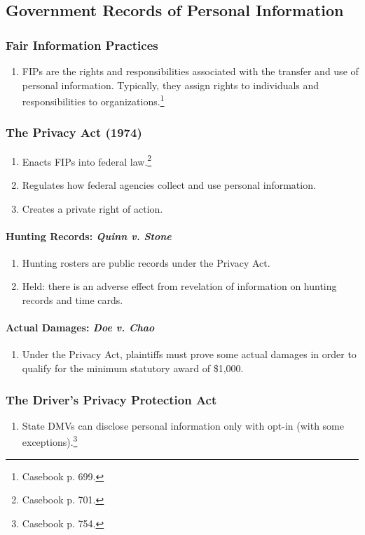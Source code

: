 \subsection{Government Records of Personal Information}

\subsubsection{Fair Information Practices}

\begin{enumerate}
    \item FIPs are the rights and responsibilities associated with the 
    transfer and use of personal information. Typically, they assign rights to 
    individuals and responsibilities to organizations.\footnote{Casebook p. 
    699.}
\end{enumerate}

\subsubsection{The Privacy Act (1974)}

\begin{enumerate}
    \item Enacts FIPs into federal law.\footnote{Casebook p. 701.}
    \item Regulates how federal agencies collect and use personal information.
    \item Creates a private right of action.
\end{enumerate}

\paragraph{Hunting Records: \emph{Quinn v. Stone}}

\begin{enumerate}
    \item Hunting rosters are public records under the Privacy Act.
    \item Held: there is an adverse effect from revelation of information on 
    hunting records and time cards.
\end{enumerate}

\paragraph{Actual Damages: \emph{Doe v. Chao}}

\begin{enumerate}
    \item Under the Privacy Act, plaintiffs must prove some actual damages 
    in order to qualify for the minimum statutory award of \$1,000.
\end{enumerate}

\subsubsection{The Driver's Privacy Protection Act}

\begin{enumerate}
    \item State DMVs can disclose personal information only with opt-in (with 
    some exceptions).\footnote{Casebook p. 754.}
\end{enumerate}

